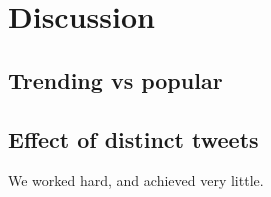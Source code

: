 \section{Discussion}\label{conclusions}
\subsection{Trending vs popular}\label{trending-discussion}
\subsection{Effect of distinct tweets}\label{trending-distinct}

We worked hard, and achieved very little.